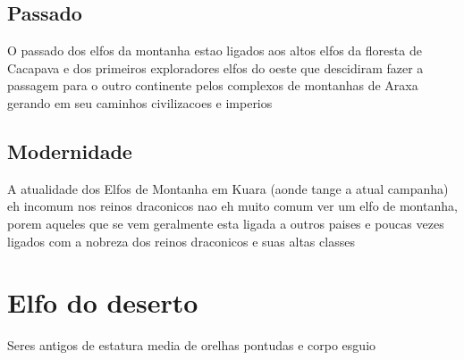 \documentclass{book}
\begin{document}
\section{Passado}
O passado dos elfos da montanha estao ligados aos altos elfos da floresta de Cacapava e dos 
primeiros exploradores elfos do oeste que descidiram fazer a passagem para o outro 
continente pelos complexos de montanhas de Araxa gerando em seu caminhos
civilizacoes e imperios 
\section{Modernidade}
A atualidade dos Elfos de Montanha em Kuara (aonde tange a atual campanha) eh incomum
nos reinos draconicos nao eh muito comum ver um elfo de montanha, porem aqueles que se vem 
geralmente esta ligada a outros paises e poucas vezes ligados com a nobreza dos reinos 
draconicos e suas altas classes 


\chapter{Elfo do deserto}
    Seres antigos de estatura media de orelhas pontudas e corpo esguio
\end{document}
